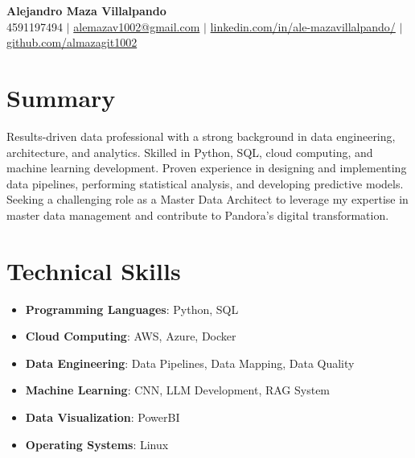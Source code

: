 \documentclass[letterpaper,10pt]{article}
\newcommand{\resumeItem}[1]{\item\small{#1}}
\newcommand{\resumeSubHeadingList}{\begin{itemize}[leftmargin=0.15in, label={}]}
\newcommand{\resumeSubHeadingListEnd}{\end{itemize}}
\begin{document}
\begin{center}
  \textbf{\Huge Alejandro Maza Villalpando} \\
  \small 4591197494 $|$ \href{mailto:alemazav1002@gmail.com}{alemazav1002@gmail.com} $|$ 
  \href{https://www.linkedin.com/in/ale-mazavillalpando/}{linkedin.com/in/ale-mazavillalpando/} $|$
  \href{https://github.com/almazagit1002}{github.com/almazagit1002}
\end{center}

\section*{Summary}
Results-driven data professional with a strong background in data engineering, architecture, and analytics. Skilled in Python, SQL, cloud computing, and machine learning development. Proven experience in designing and implementing data pipelines, performing statistical analysis, and developing predictive models. Seeking a challenging role as a Master Data Architect to leverage my expertise in master data management and contribute to Pandora's digital transformation.

\section{Technical Skills}
\resumeSubHeadingList
  \resumeItem{\textbf{Programming Languages}: Python, SQL}
  \resumeItem{\textbf{Cloud Computing}: AWS, Azure, Docker}
  \resumeItem{\textbf{Data Engineering}: Data Pipelines, Data Mapping, Data Quality}
  \resumeItem{\textbf{Machine Learning}: CNN, LLM Development, RAG System}
  \resumeItem{\textbf{Data Visualization}: PowerBI}
  \resumeItem{\textbf{Operating Systems}: Linux}
\resumeSubHeadingListEnd
\end{document}
